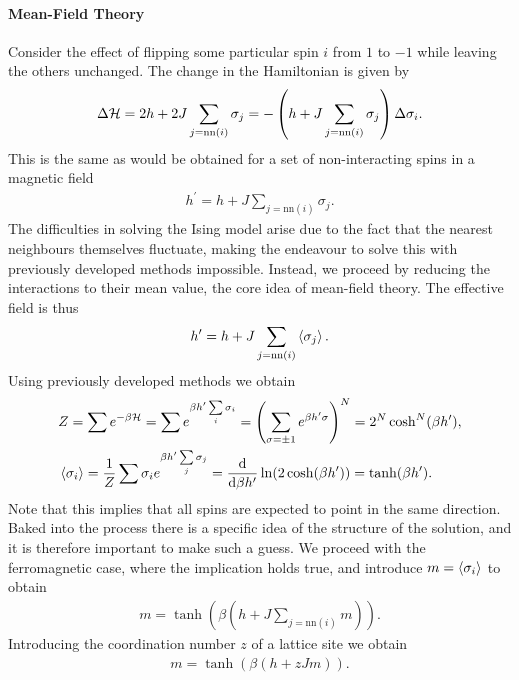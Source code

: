 \paragraph{Mean-Field Theory}
Consider the effect of flipping some particular spin $i$ from $1$ to $-1$ while leaving the others unchanged. The change in the Hamiltonian is given by
\begin{align*}
	\Delta\mathcal{H} = 2h + 2J\sum\limits_{j = \text{nn}(i)}\sigma_{j} = -\left(h + J\sum\limits_{j = \text{nn}(i)}\sigma_{j}\right)\Delta\sigma_{i}.
\end{align*}
This is the same as would be obtained for a set of non-interacting spins in a magnetic field
\begin{align*}
	h^{\prime} = h + J\sum\limits_{j = \text{nn}(i)}\sigma_{j}.
\end{align*}
The difficulties in solving the Ising model arise due to the fact that the nearest neighbours themselves fluctuate, making the endeavour to solve this with previously developed methods impossible. Instead, we proceed by reducing the interactions to their mean value, the core idea of mean-field theory. The effective field is thus
\begin{align*}
	h^{\prime} = h + J\sum\limits_{j = \text{nn}(i)}\expval{\sigma_{j}}.
\end{align*}
Using previously developed methods we obtain
\begin{align*}
	&Z = \sum e^{-\beta\mathcal{H}} = \sum e^{\beta h^{\prime}\sum\limits_{i}\sigma_{i}} = \left(\sum\limits_{\sigma = \pm 1}e^{\beta h^{\prime}\sigma}\right)^{N} = 2^{N}\cosh[N](\beta h^{\prime}), \\
	&\expval{\sigma_{i}} = \frac{1}{Z}\sum\sigma_{i}e^{\beta h^{\prime}\sum\limits_{j}\sigma_{j}} = \dv{\beta h^{\prime}}\ln(2\cosh(\beta h^{\prime})) = \tanh(\beta h^{\prime}).
\end{align*}
Note that this implies that all spins are expected to point in the same direction. Baked into the process there is a specific idea of the structure of the solution, and it is therefore important to make such a guess. We proceed with the ferromagnetic case, where the implication holds true, and introduce $m = \expval{\sigma_{i}}$ to obtain
\begin{align*}
	m = \tanh(\beta\left(h + J\sum\limits_{j = \text{nn}(i)}m\right)).
\end{align*}
Introducing the coordination number $z$ of a lattice site we obtain
\begin{align*}
	m = \tanh(\beta\left(h + zJm\right)).
\end{align*}
